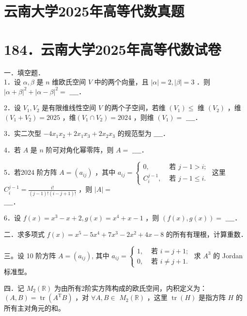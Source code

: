 \documentclass{article}
\begin{document}
\section*{云南大学2025年高等代数真题}
\section*{184．云南大学2025年高等代数试卷}
一．填空题．\\

1．设 \(\alpha, \beta\) 是 \(n\) 维欧氏空间 \(V\) 中的两个向量，且 \(|\alpha|=2,|\beta|=3\) ．则 \(|\alpha+\beta|^{2}+|\alpha-\beta|^{2}=\) \(\_\_\_\_\)．

2．设 \(V_{1}, V_{2}\) 是有限维线性空间 \(V\) 的两个子空间，若维 \(\left(V_{1}\right) \leq\) 维 \(\left(V_{2}\right)\) ，维 \(\left(V_{1}+V_{2}\right)=2025\) ，维\(\left(V_{1} \cap V_{2}\right)=2024\) ，则维 \(\left(V_{1}\right)=\) \(\_\_\_\_\)．

3．实二次型 \(-4 x_{1} x_{2}+2 x_{1} x_{3}+2 x_{2} x_{3}\) 的规范型为 \(\_\_\_\_\)．

4．若 \(A\) 是 \(n\) 阶可对角化幂零阵，则 \(A=\) \(\_\_\_\_\)．

5．若2024 阶方阵 \(A=\left(a_{i j}\right)\) ，其中 \(a_{i j}=\left\{\begin{array}{ll}0, & \text { 若 } j-1>i ; \\ C_{i}^{j-1}, & \text { 若 } j-1 \leq i .\end{array}\right.\) 这里 \(C_{i}^{j-1}=\frac{i!}{(j-1)!(i-j+1)!}\) ，则 \(|A|=\)\\
\(\_\_\_\_\)．

6．设 \(f(x)=x^{3}-x+2, g(x)=x^{4}+x-1\) ，则 \((f(x), g(x))=\) \(\_\_\_\_\)．

二．求多项式 \(f(x)=x^{5}-5 x^{4}+7 x^{3}-2 x^{2}+4 x-8\) 的所有有理根，计算重数．

三。设 10 阶方阵 \(A=\left(a_{i j}\right)\), 其中 \(a_{i j}=\left\{\begin{array}{ll}1, & \text { 若 } i=j+1 ; \\ 0, & \text { 若 } i \neq j+1 .\end{array}\right.\) 求 \(A^{3}\) 的 Jordan 标准型。

四．记 \(M_{2}(\mathbb{R})\) 为由所有2阶实方阵构成的欧氏空间，内积定义为：\((A, B)=\operatorname{tr}\left(A^{\mathrm{T}} B\right)\) ，对 \(\forall A, B \in\) \(M_{2}(\mathbb{R})\) ，这里 \(\operatorname{tr}(H)\) 是指方阵 \(H\) 的所有主对角元的和。
\end{document}
